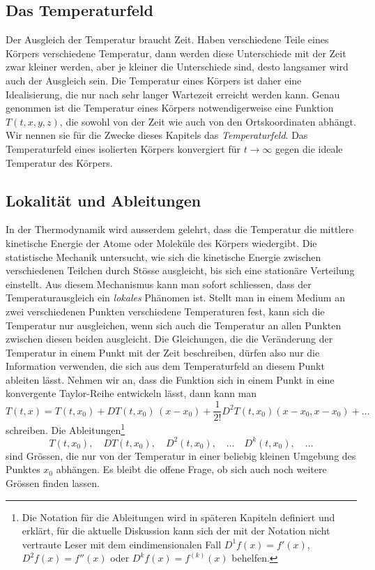 \subsection{Das Temperaturfeld}
Der Ausgleich der Temperatur braucht Zeit.
Haben verschiedene Teile eines Körpers verschiedene Temperatur, dann
werden diese Unterschiede mit der Zeit zwar kleiner werden, aber je
kleiner die Unterschiede sind, desto langsamer wird auch der Ausgleich sein.
Die Temperatur eines Körpers ist daher eine Idealisierung, die nur
nach sehr langer Wartezeit erreicht werden kann.
Genau genommen ist die Temperatur eines Körpers notwendigerweise eine
Funktion $T(t,x,y,z)$, die sowohl von der Zeit wie auch von den
Ortskoordinaten abhängt.
Wir nennen sie für die Zwecke dieses Kapitels das {\em Temperaturfeld}.
Das Temperaturfeld eines isolierten Körpers konvergiert für
$t\to\infty$ gegen die ideale Temperatur des Körpers.

\subsection{Lokalität und Ableitungen}
In der Thermodynamik wird ausserdem gelehrt, dass die Temperatur die
mittlere kinetische Energie der Atome oder Moleküle des Körpers wiedergibt.
Die statistische Mechanik untersucht, wie sich die kinetische Energie
zwischen verschiedenen Teilchen durch Stösse ausgleicht, bis sich eine
stationäre Verteilung einstellt.
Aus diesem Mechanismus kann man sofort schliessen, dass der
Temperaturausgleich ein {\em lokales} Phänomen ist.
Stellt man in einem Medium an zwei verschiedenen Punkten verschiedene
Temperaturen fest, kann sich die Temperatur nur ausgleichen, wenn
sich auch die Temperatur an allen Punkten zwischen diesen beiden
ausgleicht.
Die Gleichungen, die die Veränderung der Temperatur in einem Punkt
mit der Zeit beschreiben, dürfen also nur die Information verwenden,
die sich aus dem Temperaturfeld an diesem Punkt ableiten lässt.
Nehmen wir an, dass die Funktion sich in einem Punkt in eine konvergente
Taylor-Reihe entwickeln lässt, dann kann man
\[
T(t,x)
=
T(t,x_0) + DT(t,x_0)\, (x-x_0) + \frac{1}{2!} D^2T(t,x_0)(x-x_0,x-x_0) + \dots
\]
schreiben.
Die Ableitungen\footnote{Die Notation für die Ableitungen wird
in späteren Kapiteln definiert und erklärt, für die aktuelle Diskussion
kann sich der mit der Notation nicht vertraute Leser mit dem eindimensionalen
Fall $D^1f(x) = f'(x)$, $D^2f(x) = f''(x)$ oder $D^kf(x)=f^{(k)}(x)$ behelfen.}
\[
T(t,x_0), \quad
DT(t,x_0), \quad
D^2(t,x_0),\quad \dots\quad
D^k(t,x_0),\quad\dots
\]
sind Grössen, die nur von der Temperatur in einer beliebig kleinen
Umgebung des Punktes $x_0$ abhängen.
Es bleibt die offene Frage, ob sich auch noch weitere Grössen finden lassen.

